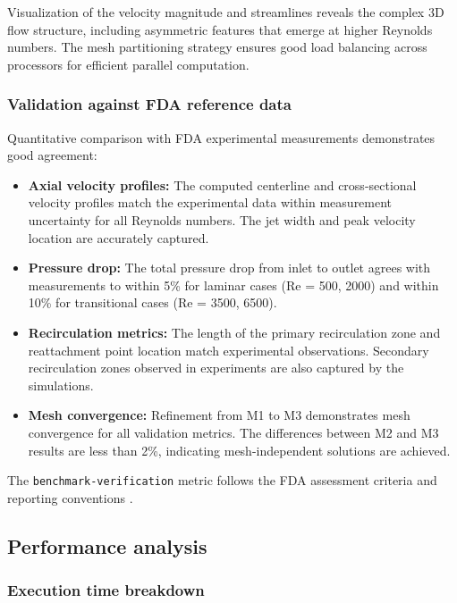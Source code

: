Visualization of the velocity magnitude and streamlines reveals the complex 3D flow structure, including asymmetric features that emerge at higher Reynolds numbers. The mesh partitioning strategy ensures good load balancing across processors for efficient parallel computation.

\subsubsection{Validation against FDA reference data}

Quantitative comparison with FDA experimental measurements demonstrates good agreement:

\begin{itemize}
\item \textbf{Axial velocity profiles:} The computed centerline and cross-sectional velocity profiles match the experimental data within measurement uncertainty for all Reynolds numbers. The jet width and peak velocity location are accurately captured.

\item \textbf{Pressure drop:} The total pressure drop from inlet to outlet agrees with measurements to within 5\% for laminar cases (Re = 500, 2000) and within 10\% for transitional cases (Re = 3500, 6500).

\item \textbf{Recirculation metrics:} The length of the primary recirculation zone and reattachment point location match experimental observations. Secondary recirculation zones observed in experiments are also captured by the simulations.

\item \textbf{Mesh convergence:} Refinement from M1 to M3 demonstrates mesh convergence for all validation metrics. The differences between M2 and M3 results are less than 2\%, indicating mesh-independent solutions are achieved.
\end{itemize}

The \texttt{benchmark-verification} metric follows the FDA assessment criteria and reporting conventions \cite{stewart_assessment_2012}.

\subsection{Performance analysis}

\subsubsection{Execution time breakdown}


